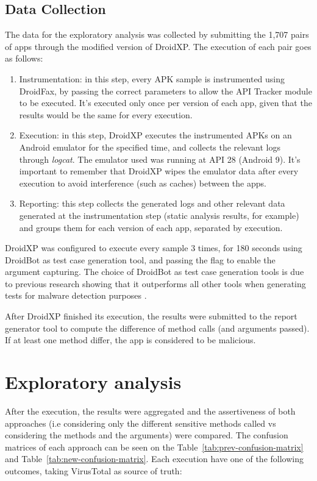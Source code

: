 \subsection{Data Collection}

The data for the exploratory analysis was collected by submitting the 1,707 pairs of apps through the modified version of DroidXP. The execution of each pair goes as follows:

\begin{enumerate}
    \item Instrumentation: in this step, every APK sample is instrumented using DroidFax, by passing the correct parameters to allow the API Tracker module to be executed. It's executed only once per version of each app, given that the results would be the same for every execution.
    \item Execution: in this step, DroidXP executes the instrumented APKs on an Android emulator for the specified time, and collects the relevant logs through \textit{logcat}. The emulator used was running at API 28 (Android 9). It's important to remember that DroidXP wipes the emulator data after every execution to avoid interference (such as caches) between the apps.
    \item Reporting: this step collects the generated logs and other relevant data generated at the instrumentation step (static analysis results, for example) and groups them for each version of each app, separated by execution.
\end{enumerate}

DroidXP was configured to execute every sample 3 times, for 180 seconds using DroidBot as test case generation tool, and passing the  flag to enable the argument capturing. The choice of DroidBot as test case generation tools is due to previous research showing that it outperforms all other tools when generating tests for malware detection purposes \cite{li_droidbot_2017}.

After DroidXP finished its execution, the results were submitted to the report generator tool to compute the difference of method calls (and arguments passed). If at least one method differ, the app is considered to be malicious.

\section{Exploratory analysis}

After the execution, the results were aggregated and the assertiveness of both approaches (i.e considering only the different sensitive methods called vs considering the methods and the arguments) were compared. The confusion matrices of each approach can be seen on the Table~\ref{tab:prev-confusion-matrix} and Table~\ref{tab:new-confusion-matrix}. Each execution have one of the following outcomes, taking VirusTotal as source of truth:

